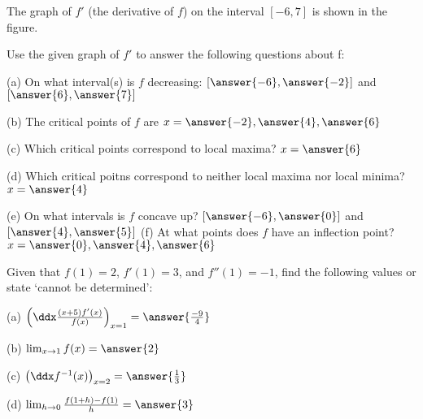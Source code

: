 \documentclass{ximera}
\begin{document}
\begin{exercise}
The graph of $f'$ (the derivative of $f$) on the interval $[-6,7]$ is shown in the figure.

\begin{image}
\end{image}



Use the given graph of $f'$ to answer the following questions about f:

(a) On what interval(s) is $f$ decreasing: $[\answer{-6},\answer{-2}]$ and $[\answer{6},\answer{7}]$

(b) The critical points of $f$ are $x=\answer{-2},\answer{4},\answer{6}$

(c) Which critical points correspond to local maxima? $x=\answer{6}$

(d) Which critical poitns correspond to neither local maxima nor local minima? $x=\answer{4}$

(e) On what intervals is $f$ concave up? $[\answer{-6},\answer{0}]$ and $[\answer{4},\answer{5}]$
(f) At what points does $f$ have an inflection point? $x=\answer{0},\answer{4},\answer{6}$
\end{exercise}

\begin{exercise}
Given that $f(1)=2$, $f'(1)=3$, and $f''(1)=-1$, find the following values or state `cannot be determined':

(a) $\left(\ddx\frac{(x+5)f'(x)}{f(x)}\right)_{x=1}=\answer{\frac{-9}{4}}$

(b) $\lim_{x\to 1}f(x)=\answer{2}$

(c) $\left(\ddx f^{-1}(x)\right)_{x=2}=\answer{\frac{1}{3}}$

(d) $\lim_{h\to 0}\frac{f(1+h)-f(1)}{h}=\answer{3}$

\end{exercise}
\end{document}
